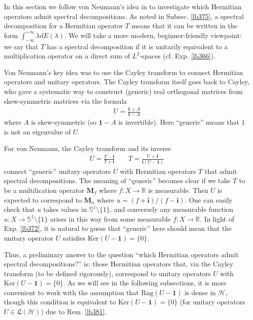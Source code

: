 \documentclass[12pt,b5paper,notitlepage]{article}
\theoremstyle{definition}
\theoremstyle{plain}
\newcommand{\fk}{\mathfrak}
\newcommand{\idt}{\mathbf{1}}
\newcommand{\im}{\mathbf{i}}
\newcommand{\Rbb}{\mathbb R}
\newcommand{\Ker}{\mathrm{Ker}}
\newcommand{\Rng}{\mathrm{Rng}}
\newcommand{\Sbb}{{\mathbb S}}
\newcommand{\MH}{\mathcal H}
\newcommand{\Mbf}{\mathbf M}
\numberwithin{equation}{section}
\begin{document}
In this section we follow von Neumann's idea in \cite{vN29a} to investigate which Hermitian operators admit spectral decompositions. As noted in Subsec. \ref{lb375}, a spectral decomposition for a Hermitian operator $T$ means that it can be written in the form $\int_{-\infty}^{+\infty}\lambda dE(\lambda)$. We will take a more modern, beginner-friendly viewpoint: we say that $T$ has a spectral decomposition if it is unitarily equivalent to a multiplication operator on a direct sum of $L^2$-spaces (cf. Exp. \ref{lb366}).

Von Neumann's key idea was to use the Cayley transform to connect Hermitian operators and unitary operators. The Cayley transform itself goes back to Cayley, who gave a systematic way to construct (generic) real orthogonal matrices from skew-symmetric matrices via the formula
\begin{align*}
U=\frac{\idt+A}{\idt-A}
\end{align*}
where $A$ is skew-symmetric (so $\idt-A$ is invertible). Here ``generic'' means that $1$ is not an eigenvalue of $U$. 

For von Neumann, the Cayley transform and its inverse
\begin{align*}
U=\frac{T-\im}{T+\im}\qquad T=\frac{U+\idt}{\im(U-\idt)}
\end{align*}
connect ``generic'' unitary operators $U$ with Hermitian operators $T$ that admit spectral decompositions. The meaning of ``generic'' becomes clear if we take $T$ to be a multilication operator $\Mbf_f$ where $f:X\rightarrow\Rbb$ is measurable. Then $U$ is expected to correspond to $\Mbf_u$ where $u=(f+\im)/(f-\im)$. One can easily check that $u$ takes values in $\Sbb^1\setminus\{1\}$, and conversely any measurable function $u:X\rightarrow\Sbb^1\setminus\{1\}$ arises in this way from some measurable $f:X\rightarrow\Rbb$. In light of Exp. \ref{lb372}, it is natural to guess that ``generic'' here should mean that the unitary operator $U$ satisfies $\Ker(U-\idt)=\{0\}$.


Thus, a preliminary answer to the question ``which Hermitian operators admit spectral decompositions?'' is: those Hermitian operators that, via the Cayley transform (to be defined rigorously), correspond to unitary operators $U$ with $\Ker(U-\idt)=\{0\}$. As we will see in the following subsections, it is more convenient to work with the assumption that $\Rng(U-\idt)$ is dense in $\MH$, though this condition is equivalent to $\Ker(U-\idt)=\{0\}$ (for unitary operators $U\in\fk L(\MH)$) due to Rem. \ref{lb381}.
\end{document}
